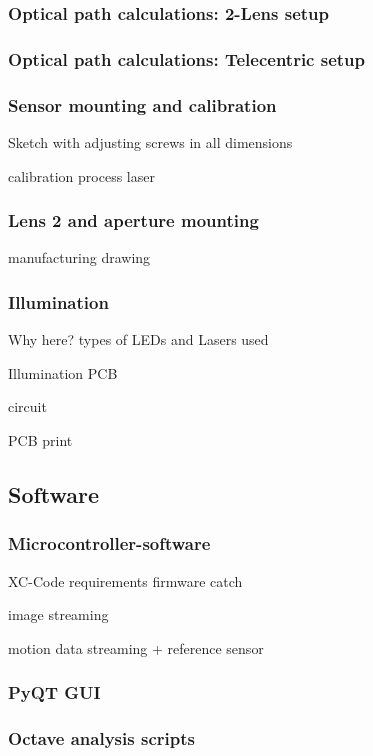 \documentclass[12pt,a4paper]{article}
\begin{document}
\subsubsection{Optical path calculations: 2-Lens setup}
\subsubsection{Optical path calculations: Telecentric setup}
\subsubsection{Sensor mounting and calibration}

Sketch with adjusting screws in all dimensions

calibration process
  laser

\subsubsection{Lens 2 and aperture mounting}

manufacturing drawing

\subsubsection{Illumination}

  Why here?
  types of LEDs and Lasers used
 
  Illumination PCB

  circuit

  PCB print

\subsection{Software}
\label{software}

\subsubsection{Microcontroller-software}

  XC-Code
    requirements
    firmware catch

    image streaming

    motion data streaming
      + reference sensor

\subsubsection{PyQT GUI}

\subsubsection{Octave analysis scripts}
\end{document}
